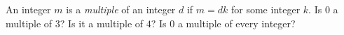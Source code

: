 An integer $m$ is a \emph{multiple} of an integer $d$ if $m=dk$ for some integer $k$. Is $0$ a multiple of $3$? Is it a multiple of $4$? Is $0$ a multiple of every integer?
